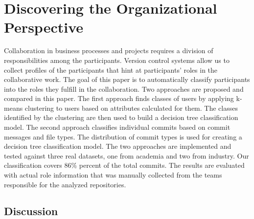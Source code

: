 \chapter{Discovering the Organizational Perspective}
\label{chap:resource-classfication}


Collaboration in business processes and projects requires a division of responsibilities among the participants. Version control systems allow us to collect profiles of the participants that hint at participants' roles in the collaborative work. The goal of this paper is to automatically classify participants into the roles they fulfill in the collaboration. Two approaches are proposed and compared in this paper. The first approach finds classes of users by applying k-means clustering to users based on attributes calculated for them. The classes identified by the clustering are then used to build a decision tree classification model. The second approach classifies individual commits based on commit messages and file types. The distribution of commit types is used for creating a decision tree classification model. The two approaches are implemented and tested against three real datasets, one from academia and two from industry. Our classification covers 86\% percent of the total commits. The results are evaluated with actual role information that was manually collected from the teams responsible for the analyzed repositories.

%




\section{Discussion}


